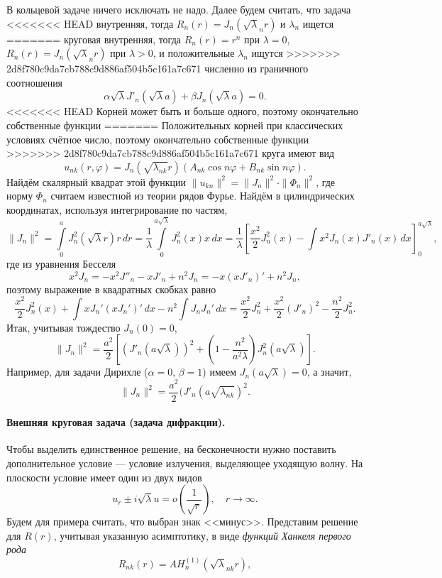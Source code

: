 В кольцевой задаче ничего исключать не надо. Далее будем считать, что задача
<<<<<<< HEAD
внутренняя, тогда $ R_n(r) = J_n(\sqrt\lambda_n r) $ и $ \lambda_n $ ищется
=======
круговая внутренняя, тогда $ R_n(r) = r^n $ при $ \lambda = 0 $, $ R_n(r) =
J_n(\sqrt\lambda_n r) $ при $ \lambda > 0 $, и положительные $
\lambda_n $ ищутся
>>>>>>> 2d8f780c9da7cb788c9d886af504b5c161a7c671
численно из
граничного соотношения  
\[
    \alpha \sqrt\lambda J'_n(\sqrt\lambda a) + \beta J_n(\sqrt\lambda a) = 0.
\]
<<<<<<< HEAD
Корней может быть и больше одного, поэтому окончательно собственные функции
=======
Положительных корней при классических условиях счётное число, поэтому окончательно собственные функции
>>>>>>> 2d8f780c9da7cb788c9d886af504b5c161a7c671
круга имеют вид 
\[
  u_{nk}(r, \varphi) = J_n(\sqrt{\lambda_{nk}} r)(A_{nk}\cos n\varphi +
  B_{nk}\sin
  n\varphi).
\]
Найдём скалярный квадрат этой функции $ \|u_{kn}\|^2 =
\|J_n\|^2\cdot\|\Phi_n\|^2 $, где норму $ \Phi_n $ считаем известной из
теории рядов Фурье. Найдём в цилиндрических координатах, используя
интегрирование по частям,
\[
    \|J_n\|^2 = \int\limits_{0}^{a} J^2_n(\sqrt\lambda r)r\,dr =
    \frac{1}{\lambda}\int\limits_{0}^{a\sqrt\lambda}J^2_n(x)x\,dx =
    \frac{1}{\lambda} \left[ \frac{x^2}{2}J^2_n(x) -
    \int x^2 J_n(x)J'_n(x)\,dx  \right]^{a\sqrt\lambda}_0,
\]
где из уравнения Бесселя
\[
  x^2 J_n = -x^2 J''_n - xJ'_n + n^2J_n = - x(xJ'_n)' + n^2 J_n,
\]
поэтому выражение в квадратных скобках равно
\[
  \frac{x^2}{2} J^2_n(x) + \int xJ_n' (xJ_n')'\,dx - n^2 \int J_n J_n' \, dx
  =
  \frac{x^2}{2} J^2_n + \frac{x^2}{2} (J'_n)^2 - \frac{n^2}{2} J^2_n.
\]
Итак, учитывая тождество $ J_n(0) = 0 $,
\[
    \|J_n\|^2 = \frac{a^2}{2} \left[ (J'_n(a\sqrt\lambda))^2 + \left( 1 -
    \frac{n^2}{a^2\lambda} \right) J_n^2 (a\sqrt\lambda) \right].
\]
Например, для задачи Дирихле ($ \alpha = 0 $, $ \beta = 1 $) имеем $
J_n(a\sqrt\lambda) = 0 $, а значит,  
\[
  \|J_n\|^2 = \frac{a^2}{2} (J'_n(a\sqrt{\lambda_{nk}})^2.
\]


\paragraph{Внешняя круговая задача (задача дифракции).}
Чтобы выделить единственное решение, на бесконечности нужно поставить
дополнительное условие --- условие излучения, выделяющее уходящую волну. На
плоскости условие имеет один из двух видов 
\[
    u_r \pm i\sqrt\lambda u = o \left( \frac{1}{\sqrt r} \right), \quad
    r\to\infty.
\]
Будем для примера считать, что выбран знак <<минус>>. Представим решение для $ R(r) $, учитывая указанную асимптотику, в виде
\emph{функций Ханкеля первого рода} 
\[
  R_{nk}(r) = A H^{(1)}_n(\sqrt\lambda_{nk} r),
\]

